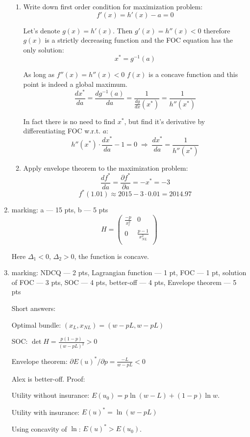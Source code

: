 \documentclass[12pt]{article} %
\theoremstyle{definition} %
\begin{document}
\begin{enumerate}
\begin{enumerate}
\item Write down first order condition for maximization problem:
\[
f'(x) = h'(x)-a=0
\]

Let's denote \(g(x)=h'(x)\). Then \(g'(x)=h''(x)<0\) therefore \(g(x)\) is a strictly decreasing function and the FOC equation has the only solution:
\[
x^* = g^{-1}(a)
\]

As long as \(f''(x)=h''(x)<0\) \(f(x)\) is a concave function and this point is indeed a global maximum.
\[
\frac{dx^*}{da} = \frac{dg^{-1}(a)}{da} =\frac{1}{\frac{dg}{dx}(x^*)}=\frac{1}{h''(x^*)}
\]

In fact there is no need to find \(x^*\), but find it's derivative by differentiating FOC w.r.t. \(a\):
\[
h''(x^*) \cdot \frac{dx^*}{da} - 1 = 0 \; \Longrightarrow \; \frac{dx^*}{da} = \frac{1}{h''(x^*)}
\]

\item Apply envelope theorem to the maximization problem:
\[
\frac{df^*}{da} = \frac{\partial f^*}{\partial a} = -x^* = -3
\]
\[
f^*(1.01) \approx 2015 -3\cdot0.01 = 2014.97
\]
\end{enumerate}

\item marking: a --- 15 pts, b --- 5 pts
\[
H = \begin{pmatrix}
\frac{-p}{x_l^2} & 0 \\
0 & \frac{p-1}{x_{NL}^2} \\
\end{pmatrix}
\]

Here $\Delta_1 < 0$, $\Delta_2 > 0$, the function is concave.

\item marking: NDCQ --- 2 pts, Lagrangian function --- 1 pt, FOC --- 1 pt, solution of FOC --- 3 pts, SOC ---
4 pts, better-off --- 4 pts, Envelope theorem --- 5 pts

Short answers:

Optimal bundle: $(x_L, x_{NL})=(w-pL, w-pL)$

SOC: $\det H = \frac{p(1-p)}{(w-pL)^2}>0$

Envelope theorem: $\partial E(u)^*/\partial p = \frac{-L}{w-pL}<0$

Alex is better-off. Proof:

Utility without insurance: $E(u_0)=p \ln (w-L) + (1-p) \ln w$.

Utility with insurance: $E(u)^*=\ln (w-pL)$

Using concavity of $\ln$: $E(u)^* > E(u_0)$.
\end{enumerate}
\end{document}
